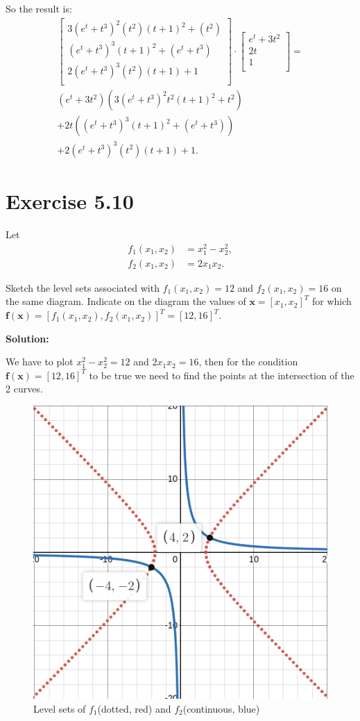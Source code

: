 \documentclass{article}
\begin{document}
So the result is:
\begin{multline*}
\begin{bmatrix}
	3(e^t+t^3)^2(t^2)(t+1)^2+(t^2)\\
	(e^t+t^3)^3(t+1)^2 + (e^t+t^3)\\
	2(e^t+t^3)^3(t^2)(t+1)+1\\
\end{bmatrix}
\cdot
\begin{bmatrix}
	e^t+3t^2\\
	2t\\
	1\\
\end{bmatrix}
=\\
(e^t+3t^2)(3(e^t+t^3)^2t^2(t+1)^2 + t^2)\\
+2t((e^t+t^3)^3(t+1)^2 + (e^t+t^3))\\
+2(e^t+t^3)^3(t^2)(t+1)+1.
\end{multline*}
\section*{Exercise 5.10}
Let
\begin{align*}
	f_1(x_1,x_2)&=x_1^2-x_2^2,\\
	f_2(x_1,x_2)&=2x_1x_2.
\end{align*}

Sketch the level sets associated with $f_1(x_1,x_2)=12$ and $f_2(x_1,x_2)=16$
on the same diagram. Indicate on the diagram the values of
$\boldsymbol{x}=[x_1,x_2]^T$ for which
$\boldsymbol{f}(\boldsymbol{x})=[f_1(x_1,x_2),f_2(x_1,x_2)]^T=[12,16]^T$.

\textbf{Solution:}

We have to plot $x_1^2-x_2^2=12$ and $2x_1x_2=16$, then for the condition
$\boldsymbol{f}(\boldsymbol{x})=[12,16]^T$ to be true we need to find the
points at the intersection of the 2 curves.

\begin{figure}[ht]
	\caption{Level sets of $f_1$(dotted, red) and $f_2$(continuous, blue)}
	\includegraphics[width=\textwidth]{sketch-hw-1.png}
\end{figure}
\end{document}
